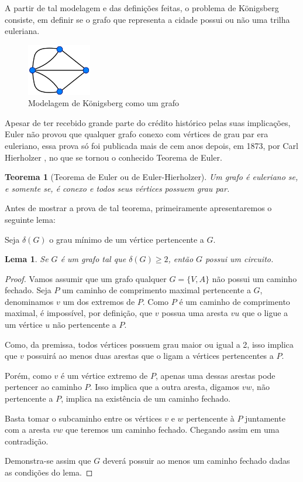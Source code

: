 \documentclass[12pt, a4paper]{article}
\newtheorem{theorem}{Teorema}[section]
\newtheorem{lemma}{Lema}
\begin{document}
A partir de tal modelagem e das definições feitas, o problema de Königsberg consiste, em definir se o grafo que representa a cidade possui ou não uma trilha euleriana. 


\begin{figure}
    \centering
    \includegraphics[width=0.25\textwidth]{konigsberg-graph.png}
    \caption{Modelagem de Königsberg como um grafo}
    \label{konigsberg-graph}
\end{figure}

Apesar de ter recebido grande parte do crédito histórico pelas suas implicações, Euler não provou que qualquer grafo conexo com vértices de grau par era euleriano, essa prova só foi publicada mais de cem anos depois, em 1873, por Carl Hierholzer \cite{hierholzer}, no que se tornou o conhecido Teorema de Euler.


\begin{theorem}[Teorema de Euler ou de Euler-Hierholzer]
    Um grafo é euleriano se, e somente se, é conexo e todos seus vértices possuem grau par.
    \label{euler}
\end{theorem}

Antes de mostrar a prova de tal teorema, primeiramente apresentaremos o seguinte lema:

Seja $\delta(G)$ o grau mínimo de um vértice pertencente a $G$.

\begin{lemma}
	\label{lema}
	Se $G$ é um grafo tal que $\delta(G) \geq 2$, então $G$ possui um circuito.
\end{lemma}

\begin{proof}
	Vamos assumir que um grafo qualquer $G = \{V, A\}$ não possui um caminho fechado. 
	Seja $P$ um caminho de comprimento maximal pertencente a $G$, denominamos $v$ um dos extremos de $P$. 
	Como $P$ é um caminho de comprimento maximal, é impossível, por definição, que $v$ possua uma aresta $vu$ que o ligue a um vértice $u$ não pertencente a $P$.
	
	Como, da premissa, todos vértices possuem grau maior ou igual a 2, isso implica que $v$ possuirá ao menos duas arestas que o ligam a vértices pertencentes a $P$.

	Porém, como $v$ é um vértice extremo de $P$, apenas uma dessas arestas pode pertencer ao caminho $P$. Isso implica que a outra aresta, digamos $vw$, não pertencente a $P$, implica na existência de um caminho fechado.

	Basta tomar o subcaminho entre os vértices $v$ e $w$ pertencente à $P$ juntamente com a aresta $vw$ que teremos um caminho fechado. Chegando assim em uma contradição.

	Demonstra-se assim que $G$ deverá possuir ao menos um caminho fechado dadas as condições do lema.
\end{proof}
\end{document}
